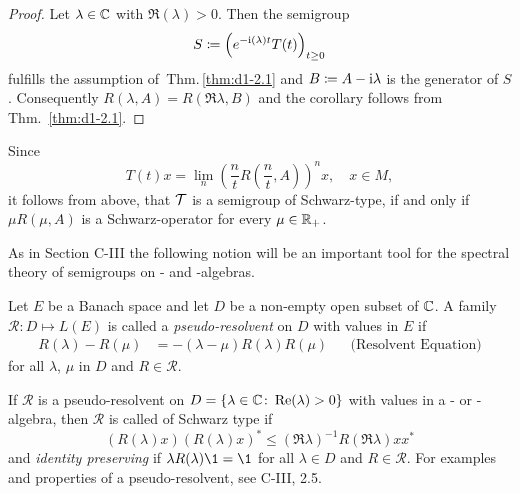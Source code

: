 \begin{proof}
Let $ \lambda \in \mathbb{C} $ with $ \Re(\lambda) > 0 $.
Then the semigroup
\[
S \coloneqq \left(e^{- \mathrm{i}  (\lambda) t }T(t) \right)_{t \geq 0}
\]
fulfills the assumption of{\ }Thm.\,\ref{thm:d1-2.1} and $ B \coloneqq A - \mathrm{i} \lambda $ is the generator of $ S $.
Consequently $ R(\lambda,A) = R(\Re\lambda,B) $ and the corollary follows from Thm.~\ref{thm:d1-2.1}.
\end{proof}
\begin{remark}\label{rem:d1-2.3}
Since 
%
\[
	T(t)x = \lim_{n} \left( \frac{n}{t} R\left(\frac{n}{t}, A\right) \right)^{n} x , \quad x \in M , 
\]
%
it follows from above, that $ \mathcal{T} $ is a semigroup of Schwarz-type, if and only if $ \mu R( \mu, A) $ is a Schwarz-operator for every $ \mu \in \mathbb{R}_{+} $.
\end{remark}
As in Section C-III the following notion will be an important tool for the spectral theory of semigroups on \CA- and \WA-algebras.
\begin{definition}\label{def:d1-2.4}
Let $E$ be a Banach space and let $D$ be a non-empty open subset of $\mathbb{C}$.
A family $ \mathcal{R} \colon D \mapsto L(E) $ is called a \emph{pseudo-resolvent} on $ D $ with values in $ E $ if
\begin{align*}
	R(\lambda) - R(\mu) &= -(\lambda - \mu)R(\lambda)R(\mu) &&\text{(Resolvent Equation)}
\end{align*}
for all $ \lambda $, $ \mu $ in $ D $ and $ R \in \mathcal{R} $.
\end{definition}
If $ \mathcal{R} $ is a {pseudo-resolvent} on $ D = \{\lambda \in \mathbb{C} \colon \mathop{}\!\mathrm{Re}(\lambda) > 0\} $ with values in a \CA- or \WA-algebra, then $ \mathcal{R} $ is called of Schwarz type if
\[
	(R(\lambda)x)(R(\lambda)x)^{*} \leq (\Re \lambda)^{-1} R(\Re\lambda)xx^{*}
\]
and \emph{identity preserving} if $ \lambda R(\lambda)\1 = \1 $ for all $ \lambda \in D $ and $ R \in \mathcal{R} $.
For examples and properties of a pseudo-resolvent, see C-III, 2.5.

